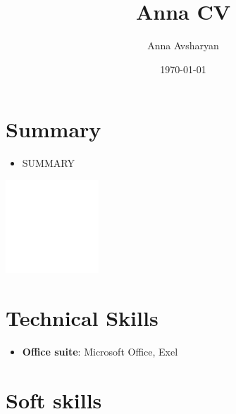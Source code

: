 \documentclass{article}
\title{ Anna CV}
\author{Anna Avsharyan}
\date{\today}
\begin{document}
 
\makecvtitle %

\section{Summary}

\begin{minipage}{0.7\textwidth}
   \begin{itemize}
      \item SUMMARY
      \end{itemize}
   \end{minipage}%
   \hfill
   \begin{minipage}{0.3\textwidth}
      \includegraphics[width=3.5cm,right]{picture.jpg}
\end{minipage}%





\section{Technical Skills}

\begin{itemize}
\item \textbf{Office suite}: Microsoft Office, Exel 
\end{itemize}
 
\section{Soft skills}

\end{document}
